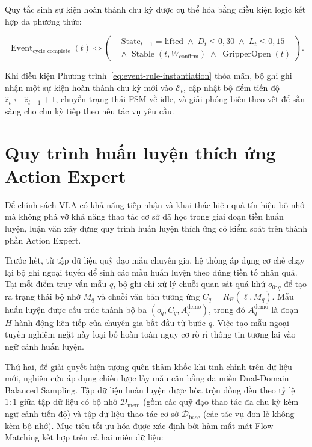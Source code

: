 Quy tắc sinh sự kiện hoàn thành chu kỳ được cụ thể hóa bằng điều kiện logic kết hợp đa phương thức:

\begin{equation}
\operatorname{Event}_{\mathrm{cycle\_complete}}(t) \iff
\left(
\begin{aligned}
&\text{State}_{t-1} = \text{lifted} \;\land\; D_t \le 0{,}30 \;\land\; L_t \le 0{,}15 \\
&\land\; \operatorname{Stable}(t, W_{\mathrm{confirm}}) \;\land\; \operatorname{GripperOpen}(t)
\end{aligned}
\right).
\label{eq:event-rule-instantiation}
\end{equation}

Khi điều kiện Phương trình~\eqref{eq:event-rule-instantiation} thỏa mãn, bộ ghi ghi nhận một sự kiện hoàn thành chu kỳ mới vào $\mathcal E_t$, cập nhật bộ đếm tiến độ $\hat z_t \leftarrow \hat z_{t-1} + 1$, chuyển trạng thái FSM về $\text{idle}$, và giải phóng biến theo vết để sẵn sàng cho chu kỳ tiếp theo nếu tác vụ yêu cầu.

\section{Quy trình huấn luyện thích ứng Action Expert}

Để chính sách VLA có khả năng tiếp nhận và khai thác hiệu quả tín hiệu bộ nhớ mà không phá vỡ khả năng thao tác cơ sở đã học trong giai đoạn tiền huấn luyện, luận văn xây dựng quy trình huấn luyện thích ứng có kiểm soát trên thành phần Action Expert.

Trước hết, từ tập dữ liệu quỹ đạo mẫu chuyên gia, hệ thống áp dụng cơ chế chạy lại bộ ghi ngoại tuyến để sinh các mẫu huấn luyện theo đúng tiền tố nhân quả. Tại mỗi điểm truy vấn mẫu $q$, bộ ghi chỉ xử lý chuỗi quan sát quá khứ $o_{0:q}$ để tạo ra trạng thái bộ nhớ $M_q$ và chuỗi văn bản tương ứng $C_q = R_B(\ell, M_q)$. Mẫu huấn luyện được cấu trúc thành bộ ba $(o_q, C_q, A_q^{\mathrm{demo}})$, trong đó $A_q^{\mathrm{demo}}$ là đoạn $H$ hành động liên tiếp của chuyên gia bắt đầu từ bước $q$. Việc tạo mẫu ngoại tuyến nghiêm ngặt này loại bỏ hoàn toàn nguy cơ rò rỉ thông tin tương lai vào ngữ cảnh huấn luyện.

Thứ hai, để giải quyết hiện tượng quên thảm khốc khi tinh chỉnh trên dữ liệu mới, nghiên cứu áp dụng chiến lược lấy mẫu cân bằng đa miền Dual-Domain Balanced Sampling. Tập dữ liệu huấn luyện được hòa trộn đồng đều theo tỷ lệ $1:1$ giữa tập dữ liệu có bộ nhớ $\mathcal D_{\mathrm{mem}}$ (gồm các quỹ đạo thao tác đa chu kỳ kèm ngữ cảnh tiến độ) và tập dữ liệu thao tác cơ sở $\mathcal D_{\mathrm{base}}$ (các tác vụ đơn lẻ không kèm bộ nhớ). Mục tiêu tối ưu hóa được xác định bởi hàm mất mát Flow Matching kết hợp trên cả hai miền dữ liệu:

